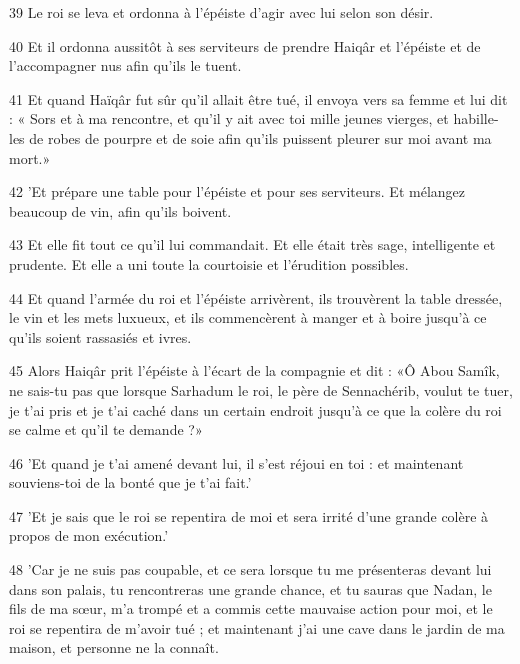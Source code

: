 \par 39 Le roi se leva et ordonna à l'épéiste d'agir avec lui selon son désir.

\par 40 Et il ordonna aussitôt à ses serviteurs de prendre Haiqâr et l'épéiste et de l'accompagner nus afin qu'ils le tuent.

\par 41 Et quand Haïqâr fut sûr qu'il allait être tué, il envoya vers sa femme et lui dit : « Sors et à ma rencontre, et qu'il y ait avec toi mille jeunes vierges, et habille-les de robes de pourpre et de soie afin qu'ils puissent pleurer sur moi avant ma mort.»

\par 42 'Et prépare une table pour l'épéiste et pour ses serviteurs. Et mélangez beaucoup de vin, afin qu'ils boivent.

\par 43 Et elle fit tout ce qu'il lui commandait. Et elle était très sage, intelligente et prudente. Et elle a uni toute la courtoisie et l'érudition possibles.

\par 44 Et quand l'armée du roi et l'épéiste arrivèrent, ils trouvèrent la table dressée, le vin et les mets luxueux, et ils commencèrent à manger et à boire jusqu'à ce qu'ils soient rassasiés et ivres.

\par 45 Alors Haiqâr prit l'épéiste à l'écart de la compagnie et dit : «Ô Abou Samîk, ne sais-tu pas que lorsque Sarhadum le roi, le père de Sennachérib, voulut te tuer, je t'ai pris et je t'ai caché dans un certain endroit jusqu'à ce que la colère du roi se calme et qu'il te demande ?»

\par 46 'Et quand je t'ai amené devant lui, il s'est réjoui en toi : et maintenant souviens-toi de la bonté que je t'ai fait.'

\par 47 'Et je sais que le roi se repentira de moi et sera irrité d'une grande colère à propos de mon exécution.'

\par 48 'Car je ne suis pas coupable, et ce sera lorsque tu me présenteras devant lui dans son palais, tu rencontreras une grande chance, et tu sauras que Nadan, le fils de ma sœur, m'a trompé et a commis cette mauvaise action pour moi, et le roi se repentira de m'avoir tué ; et maintenant j'ai une cave dans le jardin de ma maison, et personne ne la connaît.


